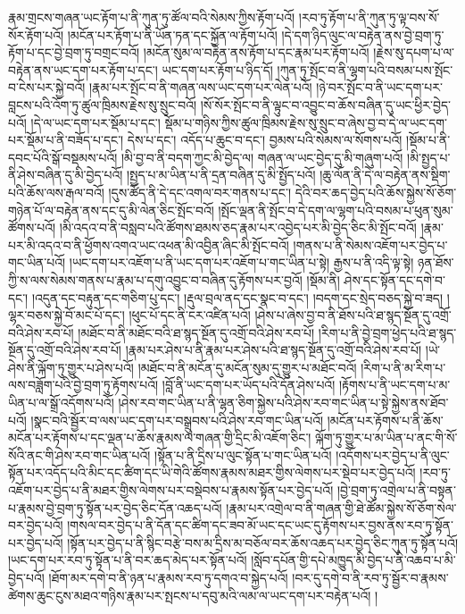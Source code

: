 རྣམ་གྲངས་གཞན་ཡང་རྟོག་པ་ནི་ཀུན་ཏུ་ཚོལ་བའི་སེམས་ཀྱིས་རྟོག་པའོ། །རབ་ཏུ་རྟོག་པ་ནི་ཀུན་ཏུ་ལྟ་བས་སོ་སོར་རྟོག་པའོ། །མངོན་པར་རྟོག་པ་ནི་ཡོན་ཏན་དང་སྐྱོན་ལ་རྟོག་པའོ། །དེ་དག་ཉིད་ལུང་ལ་བརྟེན་ནས་བྱེ་བྲག་ཏུ་རྟོག་པ་དང་བྱེ་བྲག་ཏུ་བགྲང་བའོ། །མངོན་སུམ་ལ་བརྟེན་ནས་རྟོག་པ་དང་རྣམ་པར་རྟོག་པའོ། །རྗེས་སུ་དཔག་པ་ལ་བརྟེན་ནས་ཡང་དག་པར་རྟོག་པ་དང་། ཡང་དག་པར་རྟོག་པ་ཉིད་དོ། །ཀུན་ཏུ་སྤོང་བ་ནི་ལྷག་པའི་བསམ་པས་སྤོང་བ་ངེས་པར་སྐྱེ་བའོ། །རྣམ་པར་སྤོང་བ་ནི་གཞན་ལས་ཡང་དག་པར་ལེན་པའོ། །ཉེ་བར་སྤོང་བ་ནི་ཡང་དག་པར་བླངས་པའི་འོག་ཏུ་ཚུལ་ཁྲིམས་རྗེས་སུ་སྲུང་བའོ། །སོ་སོར་སྤོང་བ་ནི་ལྟུང་བ་འབྱུང་བ་ཆོས་བཞིན་དུ་ཡང་ཕྱིར་བྱེད་པའོ། །དེ་ལ་ཡང་དག་པར་སྡོམ་པ་དང་། སྡོམ་པ་གཉིས་ཀྱིས་ཚུལ་ཁྲིམས་རྗེས་སུ་སྲུང་བ་ཞེས་བྱ་བ་དེ་ལ་ཡང་དག་པར་སྡོམ་པ་ནི་བཟོད་པ་དང་། དེས་པ་དང་། འདོད་པ་ཆུང་བ་དང་། བྱམས་པའི་སེམས་ལ་སོགས་པའོ། །སྡོམ་པ་ནི་དབང་པོའི་སྒོ་བསྡམས་པའོ། །མི་བྱ་བ་ནི་བདག་ཀྱང་མི་བྱེད་ལ། གཞན་ལ་ཡང་བྱེད་དུ་མི་གཞུག་པའོ། །མི་སྤྱད་པ་ནི་ཤེས་བཞིན་དུ་མི་བྱེད་པའོ། །སྤྱད་པ་མ་ཡིན་པ་ནི་དྲན་བཞིན་དུ་མི་སྤྱོད་པའོ། །ཆུ་ལོན་ནི་དེ་ལ་བརྟེན་ནས་སྡིག་པའི་ཆོས་ལས་རྒལ་བའོ། །དུས་ཚོད་ནི་དེ་དང་འགལ་བར་གནས་པ་དང་། དེའི་བར་ཆད་བྱེད་པའི་ཆོས་སྐྱེས་སོ་ཅོག་གཉེན་པོ་ལ་བརྟེན་ནས་དང་དུ་མི་ལེན་ཅིང་སྤོང་བའོ། །སྤོང་ལྡན་ནི་སྤོང་བ་དེ་དག་ལ་ལྷག་པའི་བསམ་པ་ཕུན་སུམ་ཚོགས་པའོ། །མི་འདའ་བ་ནི་བསླབ་པའི་ཚོགས་ཐམས་ཅད་རྣམ་པར་འབྱེད་པར་མི་བྱེད་ཅིང་མི་སྤོང་བའོ། །རྣམ་པར་མི་འདའ་བ་ནི་ཕྱོགས་འགའ་ཡང་འཕན་མི་འབྱིན་ཞིང་མི་སྤོང་བའོ། །གནས་པ་ནི་སེམས་འཇོག་པར་བྱེད་པ་གང་ཡིན་པའོ། །ཡང་དག་པར་འཇོག་པ་ནི་ཡང་དག་པར་འཇོག་པ་གང་ཡིན་པ་སྟེ། རྒྱས་པ་ནི་འདི་ལྟ་སྟེ། ཉན་ཐོས་ཀྱི་ས་ལས་སེམས་གནས་པ་རྣམ་པ་དགུ་འབྱུང་བ་བཞིན་དུ་རྟོགས་པར་བྱའོ། །སྡོམ་ནི། ཤེས་དང་སྟོན་དང་དགེ་བ་དང་། །འདུན་དང་བརྟུན་དང་གཅིག་པུ་དང་། །རྡུལ་བྲལ་ནད་དང་སྣང་བ་དང་། །བདག་དང་སྲེད་བཅད་སྐྱེ་བ་ཟད། །ལྷར་བཅས་སྐྱེ་བོ་མང་པོ་དང་། །ཕུང་པོ་དང་ནི་ངར་འཛིན་པའོ། །ཤེས་པ་ཞེས་བྱ་བ་ནི་ཐོས་པའི་ཐ་སྙད་སྔོན་དུ་འགྲོ་བའི་ཤེས་རབ་པོ། །མཐོང་བ་ནི་མཐོང་བའི་ཐ་སྙད་སྔོན་དུ་འགྲོ་བའི་ཤེས་རབ་པོ། །རིག་པ་ནི་བྱེ་བྲག་ཕྱེད་པའི་ཐ་སྙད་སྔོན་དུ་འགྲོ་བའི་ཤེས་རབ་པོ། །རྣམ་པར་ཤེས་པ་ནི་རྣམ་པར་ཤེས་པའི་ཐ་སྙད་སྔོན་དུ་འགྲོ་བའི་ཤེས་རབ་པོ། །ཡེ་ཤེས་ནི་ལྐོག་ཏུ་གྱུར་པ་ཤེས་པའོ། །མཐོང་བ་ནི་མངོན་དུ་མངོན་སུམ་དུ་གྱུར་པ་མཐོང་བའོ། །རིག་པ་ནི་མ་རིག་པ་ལས་བཟློག་པའི་བྱེ་བྲག་ཏུ་རྟོགས་པའོ། །བློ་ནི་ཡང་དག་པར་ཡོད་པའི་དོན་ཤེས་པའོ། །རྟོགས་པ་ནི་ཡང་དག་པ་མ་ཡིན་པ་ལ་སྒྲོ་འདོགས་པའོ། །ཤེས་རབ་གང་ཡིན་པ་ནི་ལྷན་ཅིག་སྐྱེས་པའི་ཤེས་རབ་གང་ཡིན་པ་སྟེ་སྐྱེས་ནས་ཐོབ་པའོ། །སྣང་བའི་སྦྱོར་བ་ལས་ཡང་དག་པར་བསྒྲུབས་པའི་ཤེས་རབ་གང་ཡིན་པའོ། །མངོན་པར་རྟོགས་པ་ནི་ཆོས་མངོན་པར་རྟོགས་པ་དང་ལྡན་པ་ཆོས་རྣམས་ལ་གཞན་གྱི་དྲིང་མི་འཇོག་ཅིང་། ལྐོག་ཏུ་གྱུར་པ་མ་ཡིན་པ་ནང་གི་སོ་སོའི་ནང་གི་ཤེས་རབ་གང་ཡིན་པའོ། །སྟོན་པ་ནི་དྲིས་པ་ལུང་སྟོན་པ་གང་ཡིན་པའོ། །འདོགས་པར་བྱེད་པ་ནི་ལུང་སྟོན་པར་འདོད་པའི་མིང་དང་ཚིག་དང་ཡི་གེའི་ཚོགས་རྣམས་མཐར་གྱིས་ལེགས་པར་སྡེབ་པར་བྱེད་པའོ། །རབ་ཏུ་འཇོག་པར་བྱེད་པ་ནི་མཐར་གྱིས་ལེགས་པར་བསྡེབས་པ་རྣམས་སྟོན་པར་བྱེད་པའོ། །བྱེ་བྲག་ཏུ་འགྲེལ་པ་ནི་བསྟན་པ་རྣམས་བྱེ་བྲག་ཏུ་སྟོན་པར་བྱེད་ཅིང་དོན་འཆད་པའོ། །རྣམ་པར་འགྲེལ་བ་ནི་གཞན་གྱི་ཐེ་ཚོམ་སྐྱེས་སོ་ཅོག་སེལ་བར་བྱེད་པའོ། །གསལ་བར་བྱེད་པ་ནི་དོན་དང་ཚིག་དང་ཟབ་མོ་ཡང་དང་ཡང་དུ་རྟོགས་པར་བྱས་ནས་རབ་ཏུ་སྟོན་པར་བྱེད་པའོ། །སྟོན་པར་བྱེད་པ་ནི་སྙིང་བརྩེ་བས་མ་དྲིས་མ་བཅོལ་བར་ཆོས་འཆད་པར་བྱེད་ཅིང་ཀུན་ཏུ་སྟོན་པའོ། །ཡང་དག་པར་རབ་ཏུ་སྟོན་པ་ནི་བར་ཆད་མེད་པར་སྟོན་པའོ། །སློབ་དཔོན་གྱི་དཔེ་མཁྱུད་མི་བྱེད་པ་ནི་འཆབ་པ་མི་བྱེད་པའོ། །ཐོག་མར་དགེ་བ་ནི་ཉན་པ་རྣམས་རབ་ཏུ་དགའ་བ་སྐྱེད་པའོ། །བར་དུ་དགེ་བ་ནི་རབ་ཏུ་སྦྱོར་བ་རྣམས་ཚེགས་ཆུང་ངུས་མཐའ་གཉིས་རྣམ་པར་སྤངས་པ་དབུ་མའི་ལམ་ལ་ཡང་དག་པར་བརྟེན་པའོ། །
